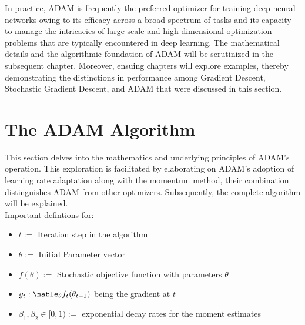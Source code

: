 \documentclass[journal]{IEEEtran}
\begin{document}
In practice, ADAM is frequently the preferred optimizer for training deep neural networks owing to its efficacy across a broad spectrum of tasks and its capacity to manage the intricacies of large-scale and high-dimensional optimization problems that are typically encountered in deep learning. The mathematical details and the algorithmic foundation of ADAM will be scrutinized in the subsequent chapter. Moreover, ensuing chapters will explore examples, thereby demonstrating the distinctions in performance among Gradient Descent, Stochastic Gradient Descent, and ADAM that were discussed in this section.


\section{The ADAM Algorithm}
This section delves into the mathematics and underlying principles of ADAM's operation. This exploration is facilitated by elaborating on ADAM's adoption of learning rate adaptation along with the momentum method, their combination distinguishes ADAM from other optimizers. Subsequently, the complete algorithm will be explained.\\
Important defintions for:
\begin{itemize}
    \item $t:=$ Iteration step in the algorithm
    \item $\theta:=$ Initial Parameter vector
    \item $f(\theta):=$ Stochastic objective function with parameters $\theta$
    \item $g_t:\nable_\theta f_t(\theta_{t-1})$ being the gradient at $t$
    \item $\beta_1, \beta_2 \in [0,1) :=$ exponential decay rates for the moment estimates
\end{itemize}
\end{document}
